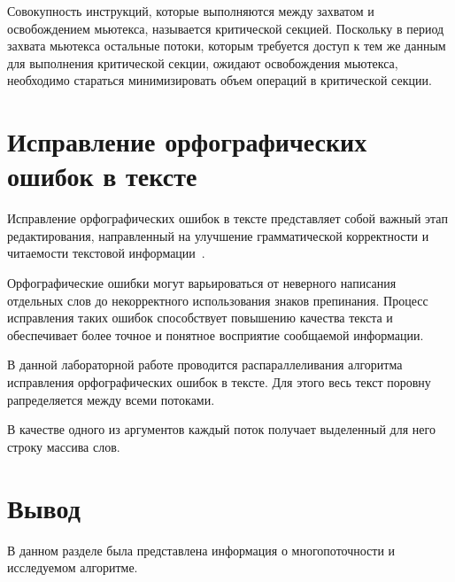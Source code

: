 Совокупность инструкций, которые выполняются между захватом и освобождением мьютекса, называется критической секцией.
Поскольку в период захвата мьютекса остальные потоки, которым требуется доступ к тем же данным для выполнения критической секции, ожидают освобождения мьютекса, необходимо стараться минимизировать объем операций в критической секции.

\section{Исправление орфографических ошибок в тексте}

Исправление орфографических ошибок в тексте представляет собой важный этап редактирования, направленный на улучшение грамматической корректности и читаемости текстовой информации~\cite{mistakes}.

Орфографические ошибки могут варьироваться от неверного написания отдельных слов до некорректного использования знаков препинания. Процесс исправления таких ошибок способствует повышению качества текста и обеспечивает более точное и понятное восприятие сообщаемой информации.

В данной лабораторной работе проводится распараллеливания алгоритма исправления орфографических ошибок в тексте. 
Для этого весь текст поровну рапределяется между всеми потоками.

В качестве одного из аргументов каждый поток получает выделенный
для него строку массива слов. 

\section*{Вывод}

В данном разделе была представлена информация о многопоточности
и исследуемом алгоритме.